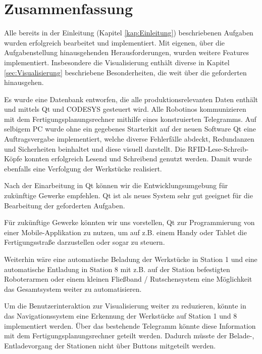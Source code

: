 
\chapter{Zusammenfassung}
\label{sec:Fazit}

Alle bereits in der Einleitung (Kapitel \ref{kap:Einleitung}) beschriebenen Aufgaben wurden erfolgreich bearbeitet und implementiert. Mit eigenen, über die Aufgabenstellung hinausgehenden Herausforderungen, wurden weitere Features implementiert. Insbesondere die Visualisierung enthält diverse in Kapitel \ref{sec:Visualisierung} beschriebene Besonderheiten, die weit über die geforderten hinausgehen. 

Es wurde eine Datenbank entworfen, die alle produktionsrelevanten Daten enthält und mittels Qt und CODESYS gesteuert wird. Alle Robotinos kommunizieren mit dem Fertigungsplanungsrechner mithilfe eines konstruierten Telegramms. Auf selbigem PC wurde ohne ein gegebenes Starterkit auf der neuen Software Qt eine Auftragsvergabe implementiert, welche diverse Fehlerfälle abdeckt, Redundanzen und Sicherheiten beinhaltet und diese visuell darstellt. Die RFID-Lese-Schreib-Köpfe konnten erfolgreich Lesend und Schreibend genutzt werden. Damit wurde ebenfalls eine Verfolgung der Werkstücke realisiert. 

Nach der Einarbeitung in Qt können wir die Entwicklungsumgebung für zukünftige Gewerke empfehlen. Qt ist als neues System sehr gut geeignet für die Bearbeitung der geforderten Aufgaben.

Für zukünftige Gewerke könnten wir uns vorstellen, Qt zur Programmierung von einer Mobile-Applikation zu nutzen, um auf z.B. einem Handy oder Tablet die Fertigungsstraße darzustellen oder sogar zu steuern. 

Weiterhin wäre eine automatische Beladung der Werkstücke in Station 1 und eine automatische Entladung in Station 8 mit z.B. auf der Station befestigten Roboterarmen oder einem kleinen Fließband / Rutschensystem eine Möglichkeit das Gesamtsystem weiter zu automatisieren. 

Um die Benutzerinteraktion zur Visualisierung weiter zu reduzieren, könnte in das Navigationssystem eine Erkennung der Werkstücke auf Station 1 und 8 implementiert werden. Über das bestehende Telegramm könnte diese Information mit dem Fertigungsplanungsrechner geteilt werden. Dadurch müsste der Belade-, Entladevorgang der Stationen nicht über Buttons mitgeteilt werden. 